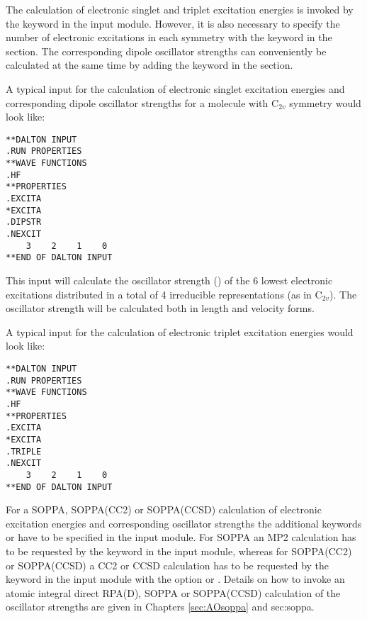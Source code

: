 The calculation of electronic singlet and triplet excitation energies
 is invoked by the keyword  in
the  input module. However, it is also necessary to
specify the number of electronic excitations in each symmetry with the keyword  in the
 section. The corresponding dipole oscillator
strengths can conveniently be calculated at
the same time by adding the keyword  in the 
section.

A typical input for the calculation of electronic singlet excitation
energies and corresponding dipole oscillator strengths for a molecule
with C$_{2v}$ symmetry would look like:

\begin{verbatim}
**DALTON INPUT
.RUN PROPERTIES
**WAVE FUNCTIONS
.HF
**PROPERTIES
.EXCITA
*EXCITA
.DIPSTR
.NEXCIT
    3    2    1    0
**END OF DALTON INPUT
\end{verbatim}
This input will calculate the oscillator strength () of the
6 lowest electronic excitations distributed in a total of 4 irreducible
representations (as in C$_{2v}$). The oscillator strength will be
calculated both in length and velocity forms.

A typical input for the calculation of electronic triplet excitation
energies would look like:
\begin{verbatim}
**DALTON INPUT
.RUN PROPERTIES
**WAVE FUNCTIONS
.HF
**PROPERTIES
.EXCITA
*EXCITA
.TRIPLE
.NEXCIT
    3    2    1    0
**END OF DALTON INPUT
\end{verbatim}



For a SOPPA, SOPPA(CC2) or
SOPPA(CCSD) calculation of electronic excitation
energies and corresponding oscillator strengths the additional keywords
 or  have to be specified in the
 input module. For SOPPA an MP2 calculation has to be
requested by the keyword  in the  input
module, whereas for SOPPA(CC2) or SOPPA(CCSD) a CC2 or CCSD calculation
has to be requested by the keyword  in the  input module with the  option  or
. Details on how to invoke an atomic integral direct
RPA(D), SOPPA or SOPPA(CCSD) calculation of the oscillator strengths
are given in Chapters \ref{sec:AOsoppa} and {sec:soppa}.


